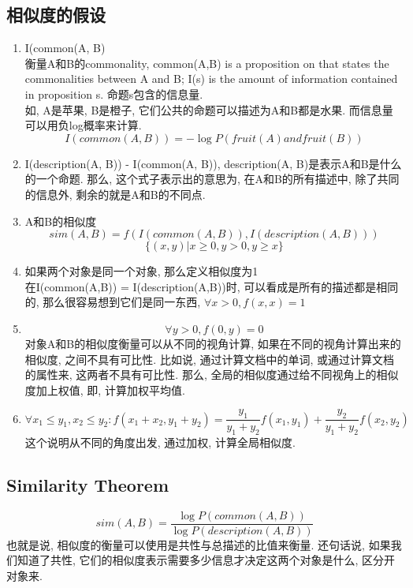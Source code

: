\documentclass[a4paper,10pt,english]{article}
\begin{document}
\subsection{相似度的假设}
\begin{enumerate}
\item{I(common(A, B)}\\
衡量A和B的commonality, common(A,B) is a proposition on that states the commonalities between A and B; I(s) is the amount of information contained in proposition s. 命题s包含的信息量. \\ 
如, A是苹果, B是橙子, 它们公共的命题可以描述为A和B都是水果. 而信息量可以用负log概率来计算.
$$ I(common(A, B)) = - \log P(fruit(A) and fruit(B))$$

\item{I(description(A, B)) - I(common(A, B))}, description(A, B)是表示A和B是什么的一个命题. 那么, 这个式子表示出的意思为, 在A和B的所有描述中, 除了共同的信息外, 剩余的就是A和B的不同点.

\item{A和B的相似度}
$$ sim(A,B) = f(I(common(A, B)), I(description(A, B))) $$
$$ \{(x, y) \vert x \geq 0, y > 0, y \geq x \} $$

\item{如果两个对象是同一个对象, 那么定义相似度为1}\\
在I(common(A,B)) = I(description(A,B))时, 可以看成是所有的描述都是相同的, 那么很容易想到它们是同一东西, $ \forall x>0, f(x, x) = 1 $

\item{}
$$ \forall y>0, f(0, y) = 0 $$
对象A和B的相似度衡量可以从不同的视角计算, 如果在不同的视角计算出来的相似度, 之间不具有可比性. 比如说, 通过计算文档中的单词, 或通过计算文档的属性来, 这两者不具有可比性. 那么, 全局的相似度通过给不同视角上的相似度加上权值, 即, 计算加权平均值.

\item{}
$$ \forall x_1 \leq y_1, x_2 \leq y_2: f(x_1 + x_2, y_1 + y_2) = \frac{y_1}{y_1 + y_2}f(x_1, y_1) + \frac{y_2}{y_1 + y_2}f(x_2, y_2) $$
这个说明从不同的角度出发, 通过加权, 计算全局相似度.

\end{enumerate}

\subsection{Similarity Theorem}
$$sim(A, B) = \frac{\log P(common(A, B))}{\log P(description(A, B))}$$
也就是说, 相似度的衡量可以使用是共性与总描述的比值来衡量. 还句话说, 如果我们知道了共性, 它们的相似度表示需要多少信息才决定这两个对象是什么, 区分开对象来.
\end{document}
